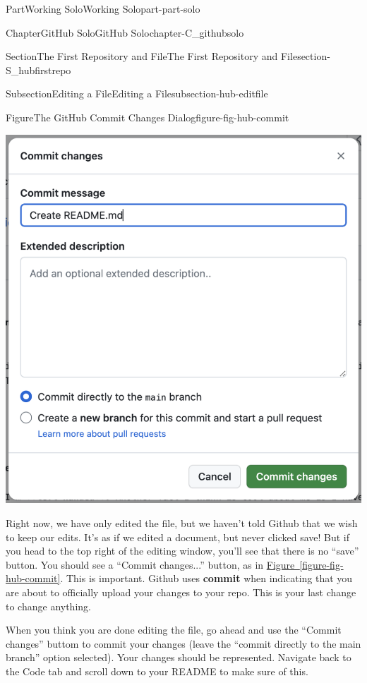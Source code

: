 \documentclass[oneside,10pt,]{book}
\newcommand{\xreffont}{\relax}
\newcommand{\terminology}[1]{\textbf{#1}}
\begin{document}
\begin{partptx}{Part}{Working Solo}{}{Working Solo}{}{}{part-part-solo}
\begin{chapterptx}{Chapter}{GitHub Solo}{}{GitHub Solo}{}{}{chapter-C_githubsolo}
\begin{sectionptx}{Section}{The First Repository and File}{}{The First Repository and File}{}{}{section-S_hubfirstrepo}
\begin{subsectionptx}{Subsection}{Editing a File}{}{Editing a File}{}{}{subsection-hub-editfile}
\begin{figureptx}{Figure}{The GitHub Commit Changes Dialog}{figure-fig-hub-commit}{}
\begin{image}{0.15}{0.7}{0.15}{}
\includegraphics[width=\linewidth]{external/hub_commit.pdf}
\end{image}%
\tcblower
\end{figureptx}%
 Right now, we have only edited the file, but we haven't told Github that we wish to keep our edits. It's as if we edited a document, but never clicked save! But if you head to the top right of the editing window, you'll see that there is no ``save'' button. You should see a ``Commit changes...'' button, as in \hyperref[figure-fig-hub-commit]{Figure~{\xreffont\ref{figure-fig-hub-commit}}}. This is important. Github uses \terminology{commit} when indicating that you are about to officially upload your changes to your repo. This is your last change to change anything.%
\par
When you think you are done editing the file, go ahead and use the ``Commit changes'' buttom to commit your changes (leave the ``commit directly to the main branch'' option selected). Your changes should be represented. Navigate back to the Code tab and scroll down to your README to make sure of this.%
\par

\end{subsectionptx}
\end{sectionptx}
\end{chapterptx}
\end{partptx}
\end{document}
